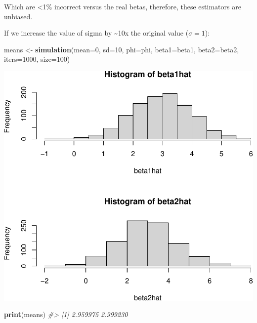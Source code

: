 \documentclass[]{article}
\newenvironment{Shaded}{\begin{snugshade}}{\end{snugshade}}
\newcommand{\CommentTok}[1]{\textcolor[rgb]{0.56,0.35,0.01}{\textit{#1}}}
\newcommand{\DataTypeTok}[1]{\textcolor[rgb]{0.13,0.29,0.53}{#1}}
\newcommand{\DecValTok}[1]{\textcolor[rgb]{0.00,0.00,0.81}{#1}}
\newcommand{\KeywordTok}[1]{\textcolor[rgb]{0.13,0.29,0.53}{\textbf{#1}}}
\newcommand{\NormalTok}[1]{#1}
\newcommand{\StringTok}[1]{\textcolor[rgb]{0.31,0.60,0.02}{#1}}
\begin{document}
Which are \textless{}1\% incorrect versus the real betas, therefore,
these estimators are unbiased.

\newpage

If we increase the value of sigma by \textasciitilde{}10x the original
value (\(\sigma = 1\)):

\begin{Shaded}
\begin{Highlighting}[]
\NormalTok{means <-}\StringTok{ }\KeywordTok{simulation}\NormalTok{(}\DataTypeTok{mean=}\DecValTok{0}\NormalTok{, }\DataTypeTok{sd=}\DecValTok{10}\NormalTok{, }\DataTypeTok{phi=}\NormalTok{phi, }\DataTypeTok{beta1=}\NormalTok{beta1, }\DataTypeTok{beta2=}\NormalTok{beta2, }\DataTypeTok{iters=}\DecValTok{1000}\NormalTok{, }\DataTypeTok{size=}\DecValTok{100}\NormalTok{)}
\end{Highlighting}
\end{Shaded}

\includegraphics{./figures/unnamed-chunk-7-1.pdf}

\begin{Shaded}
\begin{Highlighting}[]
\KeywordTok{print}\NormalTok{(means)}
\CommentTok{#> [1] 2.959975 2.999230}
\end{Highlighting}
\end{Shaded}
\end{document}
